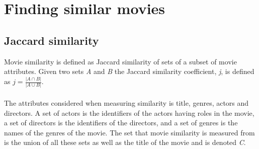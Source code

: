 \section{Finding similar movies}

\subsection{Jaccard similarity}
Movie similarity is defined as Jaccard similarity of sets of a subset of movie attributes. Given two sets \textit{A} and \textit{B} the Jaccard similarity coefficient, \textit{j}, is defined as \(j = \frac{|A \cap B|}{|A \cup B|}\). \\ \\
The attributes considered when measuring similarity is title, genres, actors and directors. A set of actors is the identifiers of the actors having roles in the movie, a set of directors is the identifiers of the directors, and a set of genres is the names of the genres of the movie. The set that movie similarity is measured from is the union of all these sets as well as the title of the movie and is denoted \textit{C}.

